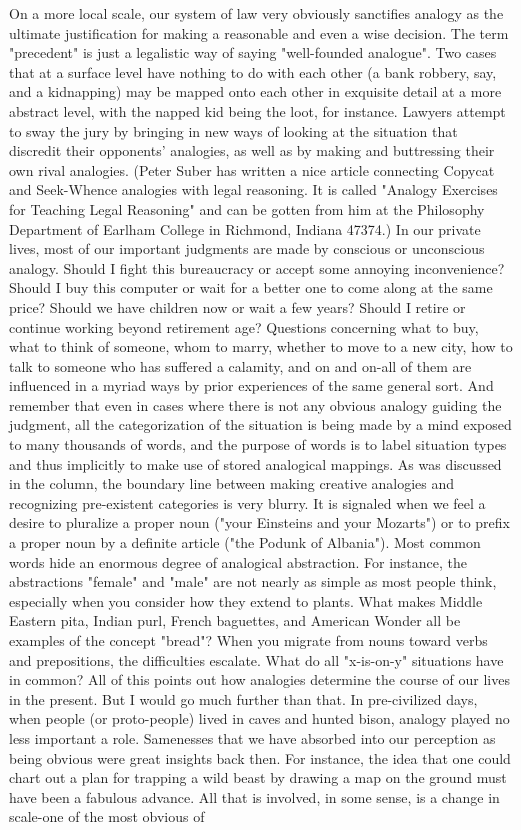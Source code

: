         On a more local scale, our system of law very obviously sanctifies analogy as
the ultimate justification for making a reasonable and even a wise decision. The term
"precedent" is just a legalistic way of saying "well-founded analogue". Two cases that
at a surface level have nothing to do with each other (a bank robbery, say, and a
kidnapping) may be mapped onto each other in exquisite detail at a more abstract
level, with the napped kid being the loot, for instance. Lawyers attempt to sway the
jury by bringing in new ways of looking at the situation that discredit their opponents'
analogies, as well as by making and buttressing their own rival analogies. (Peter
Suber has written a nice article connecting Copycat and Seek-Whence analogies with
legal reasoning. It is called "Analogy Exercises for Teaching Legal Reasoning" and
can be gotten from him at the Philosophy Department of Earlham College in
Richmond, Indiana 47374.)
        In our private lives, most of our important judgments are made by conscious
or unconscious analogy. Should I fight this bureaucracy or accept some annoying
inconvenience? Should I buy this computer or wait for a better one to come along at
the same price? Should we have children now or wait a few years? Should I retire or
continue working beyond retirement age? Questions concerning what to buy, what to
think of someone, whom to marry, whether to move to a new city, how to talk to
someone who has suffered a calamity, and on and on-all of them are influenced in a
myriad ways by prior experiences of the same general sort. And remember that even
in cases where there is not any obvious analogy guiding the judgment, all the
categorization of the situation is being made by a mind exposed to many thousands of
words, and the purpose of words is to label situation types and thus implicitly to make
use of stored analogical mappings.
        As was discussed in the column, the boundary line between making creative
analogies and recognizing pre-existent categories is very blurry. It is signaled when
we feel a desire to pluralize a proper noun ("your Einsteins and your Mozarts") or to
prefix a proper noun by a definite article ("the Podunk of Albania"). Most common
words hide an enormous degree of analogical abstraction. For instance, the
abstractions "female" and "male" are not nearly as simple as most people think,
especially when you consider how they extend to plants. What makes Middle Eastern
pita, Indian purl, French baguettes, and American Wonder all be examples of the
concept "bread"? When you migrate from nouns toward verbs and prepositions, the
difficulties escalate. What do all "x-is-on-y" situations have in common?
        All of this points out how analogies determine the course of our lives in the
present. But I would go much further than that. In pre-civilized days, when people (or
proto-people) lived in caves and hunted bison, analogy played no less important a
role. Samenesses that we have absorbed into our perception as being obvious were
great insights back then. For instance, the idea that one could chart out a plan for
trapping a wild beast by drawing a map on the ground must have been a fabulous
advance. All that is involved, in some sense, is a change in scale-one of the most
obvious of




